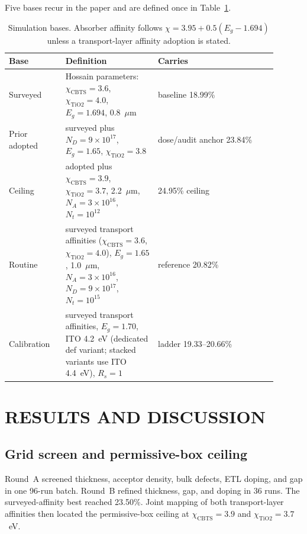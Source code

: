 \documentclass[11pt,a4paper]{article}
\begin{document}
Five bases recur in the paper and are defined once in Table~\ref{tab:bases}.

\begin{table}[tbp]
\centering
\caption{Simulation bases. Absorber affinity follows $\chi=3.95+0.5(E_g-1.694)$ unless a transport-layer affinity adoption is stated.}
\label{tab:bases}
\small
\begingroup
\setlength{\tabcolsep}{2pt}
\renewcommand{\arraystretch}{1.25}
\begin{tabular}{|p{0.19\linewidth}|p{0.31\linewidth}|p{0.40\linewidth}|}
\hline\hline
Base & Definition & Carries \\
\hline
Surveyed & Hossain parameters: $\chi_{\mathrm{CBTS}}=3.6$, $\chi_{\mathrm{TiO2}}=4.0$, $E_g=1.694$, 0.8~$\mu$m & baseline 18.99\% \\
Prior adopted & surveyed plus $N_D=9\times10^{17}$, $E_g=1.65$, $\chi_{\mathrm{TiO2}}=3.8$ & dose/audit anchor 23.84\% \\
Ceiling & adopted plus $\chi_{\mathrm{CBTS}}=3.9$, $\chi_{\mathrm{TiO2}}=3.7$, 2.2~$\mu$m, $N_A=3\times10^{16}$, $N_t=10^{12}$ & 24.95\% ceiling \\
Routine & surveyed transport affinities ($\chi_{\mathrm{CBTS}}=3.6$, $\chi_{\mathrm{TiO2}}=4.0$), $E_g=1.65$, 1.0~$\mu$m, $N_A=3\times10^{16}$, $N_D=9\times10^{17}$, $N_t=10^{15}$ & reference 20.82\% \\
Calibration & surveyed transport affinities, $E_g=1.70$, ITO 4.2~eV (dedicated def variant; stacked variants use ITO 4.4~eV), $R_s=1$ & ladder 19.33--20.66\% \\
\hline\hline
\end{tabular}
\endgroup
\end{table}

\section{RESULTS AND DISCUSSION}

\subsection{Grid screen and permissive-box ceiling}

Round~A screened thickness, acceptor density, bulk defects, ETL doping, and gap in one 96-run batch. Round~B refined thickness, gap, and doping in 36 runs. The surveyed-affinity best reached 23.50\%. Joint mapping of both transport-layer affinities then located the permissive-box ceiling at $\chi_{\mathrm{CBTS}}=3.9$ and $\chi_{\mathrm{TiO2}}=3.7$~eV.
\end{document}
